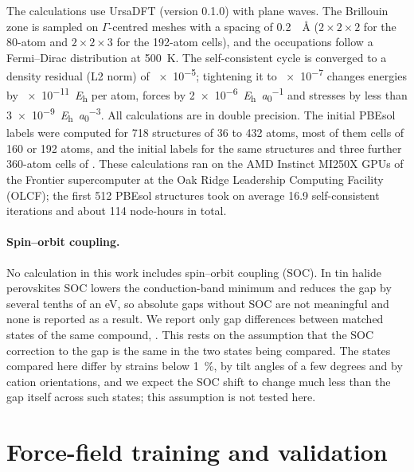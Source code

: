 The calculations use UrsaDFT (version 0.1.0) with plane waves. The Brillouin zone is sampled on $\Gamma$-centred
meshes with a spacing of \SI{0.2}{\per\angstrom} ($2\times2\times2$ for the 80-atom and $2\times2\times3$ for the
192-atom cells), and the occupations follow a Fermi--Dirac distribution at \SI{500}{K}. The self-consistent cycle is
converged to a density residual (L2 norm) of \num{e-5}; tightening it to \num{e-7} changes energies by
\SI{e-11}{\hartree} per atom, forces by \SI{2e-6}{\hartree\per\bohr} and stresses by less than
\SI{3e-9}{\hartree\per\bohr\cubed}. All calculations are in double precision. The initial PBEsol labels were computed
for 718 structures of 36 to 432 atoms, most of them cells of 160 or 192 atoms, and the initial \rSCAN{} labels for the
same structures and three further 360-atom cells of \CsSnI{}. These calculations ran on the AMD Instinct MI250X GPUs of
the Frontier supercomputer at the Oak Ridge Leadership Computing Facility (OLCF); the first 512 PBEsol structures took
on average 16.9 self-consistent iterations and about 114 node-hours in total.

\paragraph{Spin--orbit coupling.}
No calculation in this work includes spin--orbit coupling (SOC). In tin halide
perovskites SOC lowers the conduction-band minimum and reduces the gap by
several tenths of an eV,\cite{ref_soc_sn} so absolute gaps without SOC are not
meaningful and none is reported as a result. We report only gap differences
between matched states of the same compound, \dEg{}. This rests on the
assumption that the SOC correction to the gap is the same in the two states
being compared. The states compared here differ by strains below
\SI{1}{\percent}, by tilt angles of a few degrees and by cation orientations,
and we expect the SOC shift to change much less than the gap itself across
such states; this assumption is not tested here.

\section{Force-field training and validation}
\label{si:ff}
